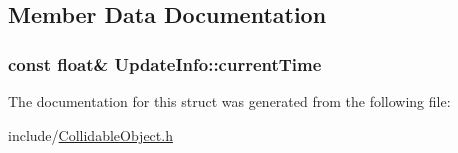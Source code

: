 \subsection{Member Data Documentation}
\hypertarget{struct_update_info_aa62f971af773009403e094c13f763bc5}{
\subsubsection[{current\-Time}]{\setlength{\rightskip}{0pt plus 5cm}const float\& Update\-Info\-::current\-Time}}\label{struct_update_info_aa62f971af773009403e094c13f763bc5}


The documentation for this struct was generated from the following file\-:\begin{DoxyCompactItemize}
\item 
include/\hyperlink{_collidable_object_8h}{Collidable\-Object.\-h}\end{DoxyCompactItemize}
